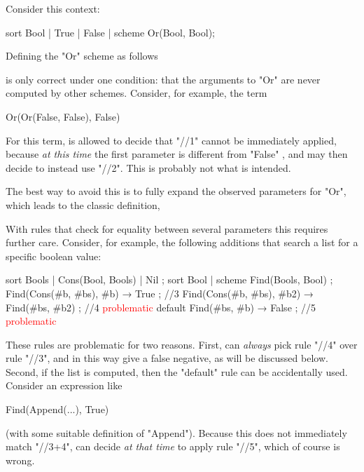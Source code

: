 \documentclass[11pt]{article} %
\begin{document}
Consider this context:
\begin{hacs}[xleftmargin=\parindent]
sort Bool | True | False | scheme Or(Bool, Bool);
\end{hacs}
Defining the "Or" scheme as follows
is only correct under one condition: that the arguments to "Or" are never computed by other
schemes. Consider, for example, the term
\begin{hacs}[xleftmargin=\parindent]
Or(Or(False, False), False)
\end{hacs}
For this term, \HAX is allowed to decide that "//1" cannot be immediately applied, because \emph{at
  this time} the first parameter is different from "False" , and \HAX may then decide to instead use
"//2". This is probably not what is intended.

The best way to avoid this is to fully expand the observed parameters for "Or", which leads to the
classic definition,
With rules that check for equality between several parameters this requires further care. Consider,
for example, the following additions that search a list for a specific boolean value:
\begin{hacs}[texcl,xleftmargin=\parindent]
sort Bools | Cons(Bool, Bools) | Nil ;
sort Bool | scheme Find(Bools, Bool) ;
Find(Cons(#b, #bs), #b) → True ;                      //3
Find(Cons(#b, #bs), #b2) → Find(#bs, #b2) ;           //4 \textcolor{red}{problematic}
default Find(#bs, #b) → False ;                       //5 \textcolor{red}{problematic}
\end{hacs}
These rules are problematic for two reasons. First, \HAX can \emph{always} pick rule "//4" over rule
"//3", and in this way give a false negative, as will be discussed below. Second, if the list is
computed, then the "default" rule can be accidentally used. Consider an expression like
\begin{hacs}[xleftmargin=\parindent]
Find(Append(...), True)
\end{hacs}
(with some suitable definition of "Append"). Because this does not immediately match "//3+4", \HAX
can decide \emph{at that time} to apply rule "//5", which of course is wrong.
\end{document}
